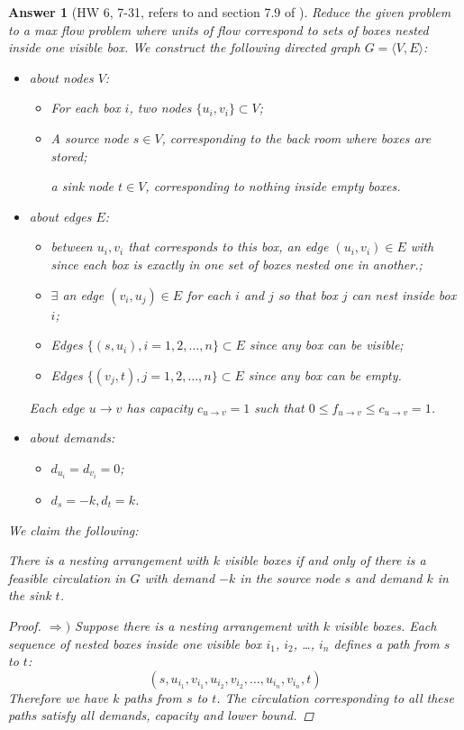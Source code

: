 \documentclass[11pt]{article}
\theoremstyle{numberplain}
\theoremstyle{nonumberplain}
\newtheorem{proof}{Proof}
\newtheorem{ans}{Answer}
\newcommand{\0}{{\mathbf{0}}}
\begin{document}
\begin{ans}[HW 6, 7-31, refers to \cite{solcornell} and section 7.9 of \cite{jon2005algorithm}] Reduce the given problem to a max flow problem
where units of flow correspond to sets of boxes nested
inside one visible box.
We construct the following directed graph $G=\langle V,E\rangle$:
\begin{itemize}
\item about nodes $V$:
\begin{itemize}
\item For each box $i$, two nodes $\{u_i,v_i\}\subset V$; 
\item A source node $s\in V$, corresponding to the back room where
  boxes are stored; \par 
  a sink node $t\in V$, corresponding to nothing inside
  empty boxes.
\end{itemize}
\item about edges $E$:
\begin{itemize}
\item between $u_i,v_i$ that corresponds to this box, an edge $(u_i,v_i)\in E$ with
since each box is exactly in one set of boxes nested one in another.;
\item   $\exists$ an edge $(v_i,u_j)\in E$ for each $i$ and $j$ so that box $j$ can nest inside box $i$;
\item Edges $\{(s,u_i),i=1,2,\ldots, n\}\subset E$ since any box can be visible;
\item Edges $\{(v_j,t),j=1,2,\ldots, n\}\subset E$ since any box can be empty.
\end{itemize}
Each edge $u\rightarrow v$ has capacity $c_{u\rightarrow v}=1$ such that $0\leq f_{u\rightarrow v}\leq c_{u\rightarrow v}=1$.
\item about demands:
\begin{itemize}
\item $d_{u_i}=d_{v_i}=0$;
\item $d_s=-k,d_t=k$.
\end{itemize}
\end{itemize}
We claim the following:
\begin{State}[Claim]
{\em There is a nesting arrangement with $k$ visible boxes if and only of
  there is a feasible circulation in $G$ with demand $-k$ in the source node
  $s$ and demand $k$ in the sink $t$.
}
\end{State}

\begin{proof}
$\Rightarrow )$ Suppose there is a nesting arrangement with $k$ visible boxes.
Each sequence of nested boxes inside one visible box $i_1$, $i_2$, \dots, $i_n$
defines a path from $s$ to $t$:
$$(s,u_{i_1},v_{i_1},u_{i_2},v_{i_2},\dots,u_{i_n},v_{i_n},t)$$
Therefore we have $k$ paths from $s$ to $t$.
The circulation corresponding to all these paths satisfy all demands,
capacity and lower bound.


\end{proof}
\end{ans}
\end{document}
